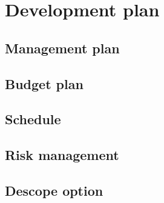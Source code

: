 \chapter{Development plan
\label{chap:plan}}

\section{Management plan}
\section{Budget plan}
\section{Schedule}
\section{Risk management}
\section{Descope option}

